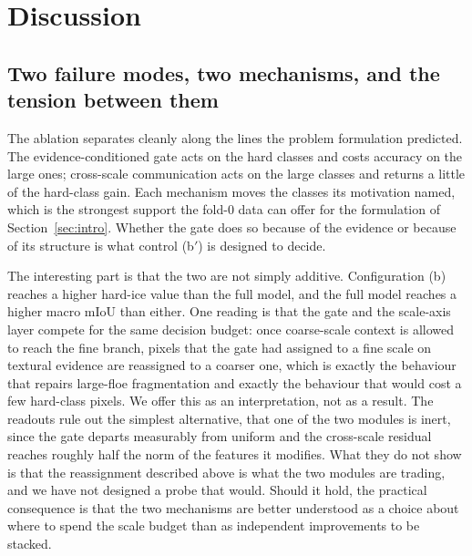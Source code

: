\documentclass[preprint,12pt,authoryear]{elsarticle}
\begin{document}

\section{Discussion}
\label{sec:discussion}

\subsection{Two failure modes, two mechanisms, and the tension between them}

The ablation separates cleanly along the lines the problem formulation
predicted. The evidence-conditioned gate acts on the hard classes and costs
accuracy on the large ones; cross-scale communication acts on the large classes
and returns a little of the hard-class gain. Each mechanism moves the classes
its motivation named, which is the strongest support the fold-0 data can offer
for the formulation of Section~\ref{sec:intro}. Whether the gate does so
because of the evidence or because of its structure is what control (b$'$) is
designed to decide.

The interesting part is that the two are not simply additive. Configuration (b)
reaches a higher hard-ice value than the full model, and the full model reaches
a higher macro mIoU than either. One reading is that the gate and the scale-axis
layer compete for the same decision budget: once coarse-scale context is allowed
to reach the fine branch, pixels that the gate had assigned to a fine scale on
textural evidence are reassigned to a coarser one, which is exactly the
behaviour that repairs large-floe fragmentation and exactly the behaviour that
would cost a few hard-class pixels. We offer this as an interpretation, not as a
result. The readouts rule out the simplest alternative, that one of the two
modules is inert, since the gate departs measurably from uniform and the
cross-scale residual reaches roughly half the norm of the features it modifies.
What they do not show is that the reassignment described above is what the two
modules are trading, and we have not designed a probe that would. Should it hold, the practical
consequence is that the two mechanisms are better understood as a choice about
where to spend the scale budget than as independent improvements to be stacked.
\end{document}

